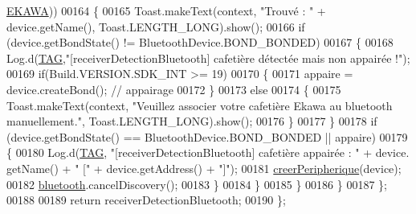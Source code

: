 \begin{DoxyCode}
      \hyperlink{classcom_1_1example_1_1ekawa_1_1_communication_a85da929bac3fd83864a79ed4c3a57044}{EKAWA}))
00164                     \{
00165                         Toast.makeText(context, \textcolor{stringliteral}{"Trouvé : "} + device.getName(), Toast.LENGTH\_LONG).show();
00166                         \textcolor{keywordflow}{if} (device.getBondState() != BluetoothDevice.BOND\_BONDED)
00167                         \{
00168                             Log.d(\hyperlink{classcom_1_1example_1_1ekawa_1_1_communication_af355bac38153a4e6d1cda0b3e74bc1c7}{TAG},\textcolor{stringliteral}{"[receiverDetectionBluetooth] cafetière détectée mais non appairée
       !"});
00169                             \textcolor{keywordflow}{if}(Build.VERSION.SDK\_INT >= 19)
00170                             \{
00171                                 appaire = device.createBond(); \textcolor{comment}{// appairage}
00172                             \}
00173                             \textcolor{keywordflow}{else}
00174                             \{
00175                                 Toast.makeText(context, \textcolor{stringliteral}{"Veuillez associer votre cafetière Ekawa au
       bluetooth manuellement."}, Toast.LENGTH\_LONG).show();
00176                             \}
00177                         \}
00178                         \textcolor{keywordflow}{if} (device.getBondState() == BluetoothDevice.BOND\_BONDED || appaire)
00179                         \{
00180                             Log.d(\hyperlink{classcom_1_1example_1_1ekawa_1_1_communication_af355bac38153a4e6d1cda0b3e74bc1c7}{TAG}, \textcolor{stringliteral}{"[receiverDetectionBluetooth] cafetière appairée : "} + device.
      getName() + \textcolor{stringliteral}{" ["} + device.getAddress() + \textcolor{stringliteral}{"]"});
00181                             \hyperlink{classcom_1_1example_1_1ekawa_1_1_communication_a41f24da10de9e598f65941bf55320566}{creerPeripherique}(device);
00182                             \hyperlink{classcom_1_1example_1_1ekawa_1_1_communication_a0ed43f74b2eae7e8f150b049953da384}{bluetooth}.cancelDiscovery();
00183                         \}
00184                     \}
00185                 \}
00186             \}
00187         \};
00188 
00189         \textcolor{keywordflow}{return} receiverDetectionBluetooth;
00190     \};
\end{DoxyCode}
\mbox{\label{classcom_1_1example_1_1ekawa_1_1_communication_a98808d0236e547b9a3ee485f66aa7af0}} 

